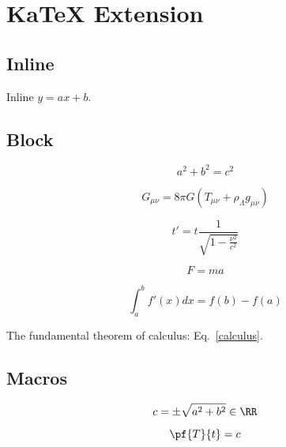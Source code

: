 
\chapter{\label{katex-extension}KaTeX Extension}
\section{\label{inline}Inline}
\par Inline $y=ax+b$.
\section{\label{block}Block}
\par 
\begin{equation}
a^2 + b^2 = c^2
\end{equation}

\par 
\begin{equation*}
G_{\mu\nu} = 8\pi G(T_{\mu\nu} + \rho_{\Lambda} g_{\mu\nu})
\end{equation*}

\par 
\begin{equation}
t' = t \frac{1}{\sqrt{1 - \frac{\nu^2}{c^2}}}
\end{equation}

\par 
\begin{equation}
F = ma
\end{equation}
 
\par 
\begin{equation}
\label{calculus}
 \int_a^b f'(x)dx = f(b) - f(a)
\end{equation}

\par The fundamental theorem of calculus: Eq.~\eqref{calculus}.
\section{\label{macros}Macros}
\par 
\begin{equation}
c = \pm\sqrt{a^2 + b^2}\in\RR
\end{equation}

\par 
\begin{equation}
\pf{T}{t} = c
\end{equation}
 